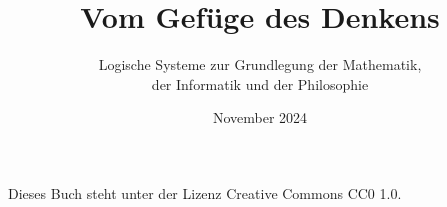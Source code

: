 \documentclass[paper=186mm:234mm,pagesize=auto,fleqn,11pt,dvipdfmx]{scrbook}
\title{Vom Gefüge des Denkens}
\subtitle{Logische Systeme zur Grundlegung der Mathematik,\\
der Informatik und der Philosophie}
\date{November 2024}
\theoremstyle{rmbox}
\numberwithin{Definition}{chapter}
\numberwithin{Satz}{chapter}
\begin{document}
\renewcommand{\figurename}{Abb.}
\renewcommand{\thepage}{C\arabic{page}}


\newpage
\thispagestyle{empty}
\mbox{}

\newpage
\addtocounter{page}{-2}
\renewcommand{\thepage}{\arabic{page}}
\thispagestyle{empty}

\maketitle


\noindent
Dieses Buch steht unter der Lizenz Creative Commons CC0 1.0.

\tableofcontents















\printindex
\end{document}

